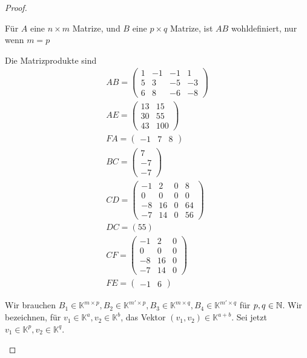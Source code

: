 \begin{proof}
	\begin{parts}
	\item F\"{u}r $A$ eine $n\times m$ Matrize, und $B$ eine $p\times q$ Matrize, ist $AB$ wohldefiniert, nur wenn $m=p$

		Die Matrizprodukte sind
		\begin{gather*}
			AB=\begin{pmatrix} 1 & -1 & -1 & 1\\5 & 3 & -5 & -3 \\ 6 & 8 & -6 & -8 \end{pmatrix}\\
			AE=\begin{pmatrix} 13 & 15 \\ 30 & 55 \\ 43 & 100 \end{pmatrix} \\
			FA=\begin{pmatrix} -1 & 7 & 8 \end{pmatrix}\\ 
			BC=\begin{pmatrix} 7 \\ -7 \\ -7 \end{pmatrix}\\
			CD=\begin{pmatrix} -1 & 2 & 0 & 8 \\ 0 & 0 & 0 & 0\\-8 & 16 & 0 & 64\\-7 & 14 & 0 & 56 \end{pmatrix}\\
			DC=(55)\\
			CF=\begin{pmatrix} -1 & 2 & 0 \\ 0 & 0 & 0 \\ -8 & 16 & 0\\-7 & 14 & 0 \end{pmatrix}\\ 
			FE=\begin{pmatrix} -1 & 6 \end{pmatrix} 
		\end{gather*}
	\item Wir brauchen $B_1\in\mathbb{K}^{m\times p},B_2\in\mathbb{K}^{m'\times p}, B_3\in\mathbb{K}^{m\times q}, B_4\in\mathbb{K}^{m'\times q}$ f\"{u}r $p,q\in \mathbb{N}$. Wir bezeichnen, f\"{u}r $v_1\in\mathbb{K}^a,v_2\in\mathbb{K}^b$, das Vektor $(v_1,v_2)\in\mathbb{K}^{a+b}$. Sei jetzt $v_1\in \mathbb{K}^p,v_2\in\mathbb{K}^q$.

\end{parts}
\end{proof}
